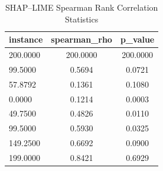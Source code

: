 \begin{table}
\centering
\caption{SHAP–LIME Spearman Rank Correlation Statistics}
\label{tab:agreement}
\begin{tabular}{lcc}
\toprule
instance & spearman_rho & p_value \\
\midrule
200.0000 & 200.0000 & 200.0000 \\
99.5000 & 0.5694 & 0.0721 \\
57.8792 & 0.1361 & 0.1080 \\
0.0000 & 0.1214 & 0.0003 \\
49.7500 & 0.4826 & 0.0110 \\
99.5000 & 0.5930 & 0.0325 \\
149.2500 & 0.6692 & 0.0900 \\
199.0000 & 0.8421 & 0.6929 \\
\bottomrule
\end{tabular}
\end{table}
